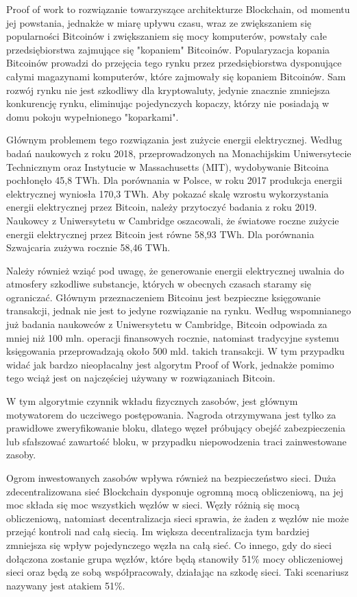 \documentclass[a4paper,13pt]{report}
\begin{document}
Proof of work to rozwiązanie towarzyszące architekturze Blockchain, od momentu jej powstania, jednakże w miarę upływu czasu, wraz ze zwiększaniem się popularności Bitcoinów i zwiększaniem się mocy komputerów, powstały całe przedsiębiorstwa zajmujące się "kopaniem" Bitcoinów. Popularyzacja kopania Bitcoinów prowadzi do przejęcia tego rynku przez przedsiębiorstwa dysponujące całymi magazynami komputerów, które zajmowały się kopaniem Bitcoinów. Sam rozwój rynku nie jest  szkodliwy dla kryptowaluty, jedynie znacznie zmniejsza konkurencję rynku, eliminując pojedynczych kopaczy, którzy nie posiadają w domu pokoju wypełnionego "koparkami". 

Głównym problemem tego rozwiązania jest zużycie energii elektrycznej. Według badań naukowych z roku 2018, przeprowadzonych na Monachijskim Uniwersytecie Technicznym oraz Instytucie w Massachusetts (MIT), wydobywanie Bitcoina pochłonęło 45,8 TWh. Dla porównania w Polsce, w roku 2017 produkcja energii elektrycznej wyniosła 170,3 TWh. Aby pokazać skalę wzrostu wykorzystania energii elektrycznej przez Bitcoin, należy przytoczyć badania z roku 2019. Naukowcy z Uniwersytetu w Cambridge oszacowali, że światowe roczne zużycie energii elektrycznej przez Bitcoin jest równe 58,93 TWh. Dla porównania Szwajcaria zużywa rocznie 58,46 TWh. 

Należy również wziąć pod uwagę, że generowanie energii elektrycznej uwalnia do atmosfery szkodliwe substancje, których w obecnych czasach staramy się ograniczać. Głównym przeznaczeniem Bitcoinu jest bezpieczne księgowanie transakcji, jednak nie jest to jedyne rozwiązanie na rynku. Według wspomnianego już badania naukowców z Uniwersytetu w Cambridge, Bitcoin odpowiada za mniej niż 100 mln. operacji finansowych rocznie, natomiast tradycyjne systemu księgowania przeprowadzają około 500 mld. takich transakcji. W tym przypadku widać jak bardzo nieopłacalny jest algorytm Proof of Work, jednakże pomimo tego wciąż jest on najczęściej używany w rozwiązaniach Bitcoin.

W tym algorytmie czynnik wkładu fizycznych zasobów, jest głównym motywatorem do uczciwego postępowania. Nagroda otrzymywana jest tylko za prawidłowe zweryfikowanie bloku, dlatego węzeł próbujący obejść zabezpieczenia lub sfałszować zawartość bloku, w przypadku niepowodzenia traci zainwestowane zasoby.

Ogrom inwestowanych zasobów wpływa również na bezpieczeństwo sieci. Duża zdecentralizowana sieć Blockchain dysponuje ogromną mocą obliczeniową, na jej moc składa się moc wszystkich węzłów w sieci. Węzły różnią się mocą obliczeniową, natomiast decentralizacja sieci sprawia, że żaden z węzłów nie może przejąć kontroli nad całą siecią. Im większa decentralizacja tym bardziej zmniejsza się wpływ pojedynczego węzła na całą sieć. Co innego, gdy do sieci dołączona zostanie grupa węzłów, które będą stanowiły 51\% mocy obliczeniowej sieci oraz będą ze sobą współpracowały, działając na szkodę sieci. Taki scenariusz nazywany jest atakiem 51\%. 
\end{document}
